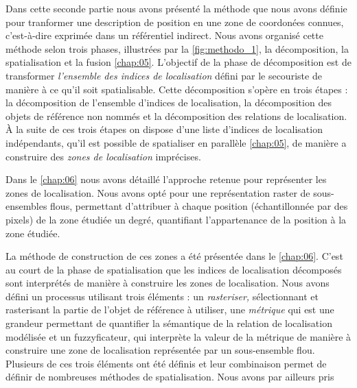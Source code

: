 Dans cette seconde partie nous avons présenté la méthode que nous
avons définie pour tranformer une description de position en une zone
de coordonées connues, c'est-à-dire exprimée dans un référentiel
indirect. Nous avons organisé cette méthode selon trois phases,
illustrées par la \autoref{fig:methodo_1}, la décomposition, la
spatialisation et la fusion \autoref{chap:05}. L'objectif de la phase
de décomposition est de transformer \emph{l'ensemble des indices de
  localisation} défini par le secouriste de manière à ce qu'il soit
spatialisable. Cette décomposition s'opère en trois étapes : la
décomposition de l'ensemble d'indices de localisation, la
décomposition des objets de référence non nommés et la décomposition
des relations de localisation. À la suite de ces trois étapes on
dispose d'une liste d'indices de localisation indépendants, qu'il est
possible de spatialiser en parallèle \autoref{chap:05}, de manière a
construire des \emph{zones de localisation} imprécises.

Dans le \autoref{chap:06} nous avons détaillé l'approche retenue pour
représenter les zones de localisation. Nous avons opté pour une
représentation raster de sous-ensembles flous, permettant d'attribuer
à chaque position (échantillonnée par des pixels) de la zone étudiée
un degré, quantifiant l'appartenance de la position à la zone
étudiée.

La méthode de construction de ces zones a été présentée dans le
\autoref{chap:06}. C'est au court de la phase de spatialisation que
les indices de localisation décomposés sont interprétés de manière à
construire les zones de localisation. Nous avons défini un processus
utilisant trois éléments : un \emph{rasteriser,} sélectionnant et
rasterisant la partie de l'objet de référence à utiliser, une
\emph{métrique} qui est une grandeur permettant de quantifier la
sémantique de la relation de localisation modélisée et un
fuzzyficateur, qui interprète la valeur de la métrique de manière à
construire une zone de localisation représentée par un sous-ensemble
flou. Plusieurs de ces trois éléments ont été définis et leur
combinaison permet de définir de nombreuses méthodes de
spatialisation. Nous avons par ailleurs pris
